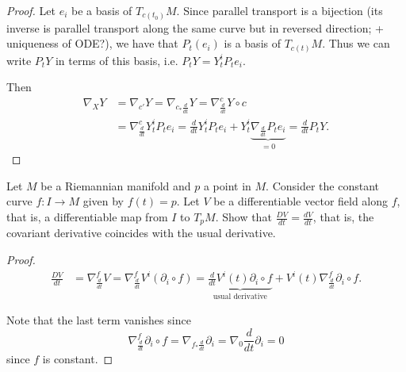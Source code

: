 \begin{proof}
Let $e_i$ be a basis of $T_{c(t_0)}M$.
Since parallel transport is a bijection
(its inverse is parallel transport 
along the same curve but in reversed direction;
+ uniqueness of ODE?),
we have that $P_t(e_i)$ is a basis of $T_{c(t)}M$.
Thus we can write $P_tY$ in terms of this basis, i.e.
$P_tY = Y^i_tP_te_i$.

Then
\begin{align*}
\nabla_XY&=\nabla_{c'}Y=\nabla_{c_*\frac{d}{dt}}Y
=\nabla_{\frac{d}{dt}}^{c}Y \circ c\\
&=\nabla^c_{\frac{d}{dt}}Y^i_tP_te_i
=\frac{d}{dt}Y^i_tP_te_i+Y^i_t\underbrace{\nabla_{\frac{d}{dt}}P_te_i}_{=0}
=\frac{d}{dt}P_tY.
\end{align*}
\end{proof}

\begin{exercise}
\label{exercise-constant-curve-connection}
Let $M$ be a Riemannian manifold and $p$ a point in $M$.
Consider the constant curve $f:I \to M$ given by $f(t)=p$.
Let $V$ be a differentiable vector field along $f$,
that is, a differentiable map from $I$ to $T_pM$.
Show that $\frac{DV}{dt}=\frac{dV}{dt}$, that is,
the covariant derivative coincides with the usual derivative.
\end{exercise}

\begin{proof}
\begin{align*}
\frac{DV}{dt}&=\nabla^f_{\frac{d}{dt}}V
=\nabla^f_{\frac{d}{dt}}V^i(\partial_i\circ f)
=\underbrace{\frac{d}{dt}V^i(t)\partial_i\circ f}_{\text{usual derivative}}
+V^i(t)\nabla_{\frac{d}{dt}}^f\partial_i \circ f.
\end{align*}

\noindent
Note that the last term vanishes since
$$
\nabla^f_{\frac{d}{dt}}\partial_i \circ f
= \nabla_{f_*\frac{d}{dt}}\partial_i
=\nabla_0\frac{d}{dt}\partial_i=0
$$
since $f$ is constant.
\end{proof}

